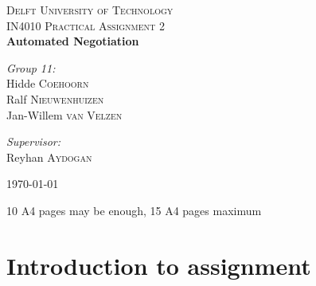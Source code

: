 \documentclass[11pt,a4paper]{report}
\begin{document}
\begin{titlepage}
\begin{center}



\textsc{\LARGE Delft University of Technology}\\[1.5cm]

\textsc{\Large IN4010 Practical Assignment 2}\\[0.5cm]

{ \huge \bfseries Automated Negotiation \\[0.4cm] }


\noindent
\begin{minipage}{0.4\textwidth}
\begin{flushleft} \large
\emph{Group 11:}\\
Hidde \textsc{Coehoorn}\\
Ralf \textsc{Nieuwenhuizen}\\
Jan-Willem \textsc{van Velzen}
\end{flushleft}
\end{minipage}%
\begin{minipage}{0.4\textwidth}
\begin{flushright} \large
\emph{Supervisor:} \\
Reyhan \textsc{Aydogan}
\end{flushright}
\end{minipage}

\vfill

{\large \today}

\end{center}
\end{titlepage}

\newpage

10 A4 pages may be enough, 15 A4 pages maximum\\







\section*{Introduction to assignment}
\end{document}
